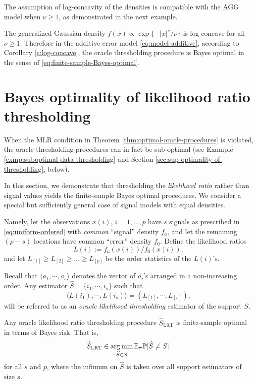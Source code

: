 The assumption of log-concavity of the densities is compatible with the AGG model when $\nu\ge1$, as 
demonstrated in the next example.

\begin{example} \label{exmp:AGG-logconcave}
The generalized Gaussian density $f(x)\propto \exp\{-|x|^\nu/\nu\}$ is log-concave for all $\nu\ge1$.
Therefore in the additive error model \eqref{eq:model-additive}, according to Corollary \ref{c:log-concave}, the oracle thresholding procedure is Bayes optimal in the sense of \eqref{eq:finite-sample-Bayes-optimal}.
\end{example}



\section{Bayes optimality of likelihood ratio thresholding}
\label{subsec:optimal-procedure-super-exponential}

When the MLR condition in Theorem \ref{thm:optimal-oracle-procedures} is violated, the oracle thresholding 
procedures can in fact be sub-optimal (see Example \ref{exmp:suboptimal-data-thresholding} and 
Section \ref{sec:sup-optimality-of-thresholding}, below).  
%

In this section, we demonstrate that thresholding the \emph{likelihood ratio} rather than signal values
yields the finite-sample Bayes optimal procedures.  We consider a special but sufficiently general case of signal 
models with equal densities.

Namely, let the observations $x(i)$, $i=1,\ldots,p$ have $s$ signals as prescribed in \eqref{eq:uniform-ordered} with {\em common} ``signal'' density $f_a$, and let the remaining $(p-s)$ locations have common ``error'' density $f_0$.
Define the likelihood ratios 
$$
L(i) := {f_a(x(i))}\big/{f_0(x(i))},
$$
and let $L_{[1]} \ge L_{[2]} \ge \ldots \ge L_{[p]}$ be the order statistics of the $L(i)$'s.

\begin{definition} Recall that $\langle a_1,\cdots,a_s\rangle$ denotes
the vector of $a_i$'s arranged in a non-increasing order.  Any estimator $\hat S = \{i_1,\cdots,i_s\}$ such that
$$
\langle L(i_1),\cdots,L(i_s) \rangle = (L_{[1]},\cdots,L_{[s]}),
$$
will be referred to as an {\em oracle likelihood thresholding} estimator of the support $S$.
\end{definition}
\begin{theorem} \label{thm:likelihood-ratio-thresholding} Any oracle likelihood ratio thresholding 
procedure $\widehat{S}_{\text{LRT}}$ is finite-sample optimal in terms of Bayes risk. That is,
\begin{equation}
    \widehat{S}_{\text{LRT}} \in \operatorname*{arg\,min}_{\widehat{S} \in {\mathcal S}} {\mathbb E}_\pi {\mathbb P}[\widehat{S} \neq S].
\end{equation}
for all $s$ and $p$, where the infimum on $\widehat{S}$ is taken over all support estimators of size $s$.
\end{theorem} 

